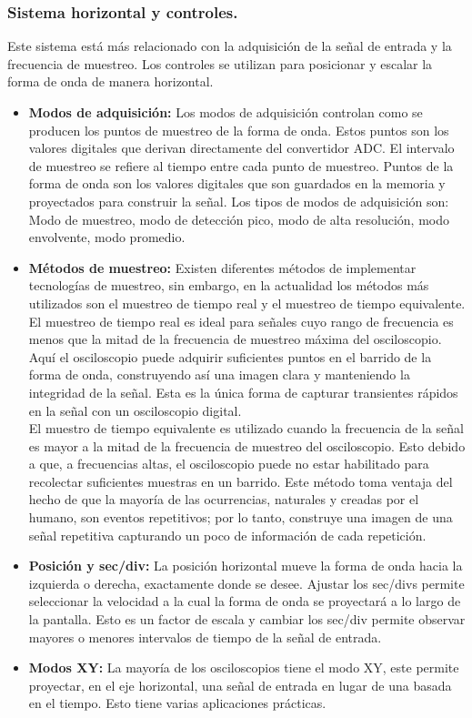 \documentclass[12pt,letterpaper]{report}
\begin{document}
\subsubsection{Sistema horizontal y controles.} Este sistema está más relacionado con la adquisición de la señal de entrada y la frecuencia de muestreo. Los controles se utilizan para posicionar y escalar la forma de onda de manera horizontal.
\begin{itemize}
\item \textbf{Modos de adquisición:} Los modos de adquisición controlan como se producen los puntos de muestreo de la forma de onda. Estos puntos son los valores digitales que derivan directamente del convertidor ADC. El intervalo de muestreo se refiere al tiempo entre cada punto de muestreo. Puntos de la forma de onda son los valores digitales que son guardados en la memoria y proyectados para construir la señal. Los tipos de modos de adquisición son: Modo de muestreo, modo de detección pico, modo de alta resolución, modo envolvente, modo promedio.
\item \textbf{Métodos de muestreo:} Existen diferentes métodos de implementar tecnologías de muestreo, sin embargo, en la actualidad los métodos más utilizados son el muestreo de tiempo real y el muestreo de tiempo equivalente.\\
El muestreo de tiempo real es ideal para señales cuyo rango de frecuencia es menos que la mitad de la frecuencia de muestreo máxima del osciloscopio. Aquí el osciloscopio puede adquirir suficientes puntos en el barrido de la forma de onda, construyendo así una imagen clara y manteniendo la integridad de la señal. Esta es la única forma de capturar transientes rápidos en la señal con un osciloscopio digital.\\
El muestro de tiempo equivalente es utilizado cuando la frecuencia de la señal es mayor a la mitad de la frecuencia de muestreo del osciloscopio. Esto debido a que, a frecuencias altas, el osciloscopio puede no estar habilitado para recolectar suficientes muestras en un barrido. Este método toma ventaja del hecho de que la mayoría de las ocurrencias, naturales y creadas por el humano, son eventos repetitivos; por lo tanto, construye una imagen de una señal repetitiva capturando un poco de información de cada repetición.
\item \textbf{Posición y sec/div:} La posición horizontal mueve la forma de onda hacia la izquierda o derecha, exactamente donde se desee. Ajustar los sec/divs permite seleccionar la velocidad a la cual la forma de onda se proyectará a lo largo de la pantalla. Esto es un factor de escala y cambiar los sec/div permite observar mayores o menores intervalos de tiempo de la señal de entrada.
\item \textbf{Modos XY:} La mayoría de los osciloscopios tiene el modo XY, este permite proyectar, en el eje horizontal, una señal de entrada en lugar de una basada en el tiempo. Esto tiene varias aplicaciones prácticas.
\end{itemize}
\end{document}
